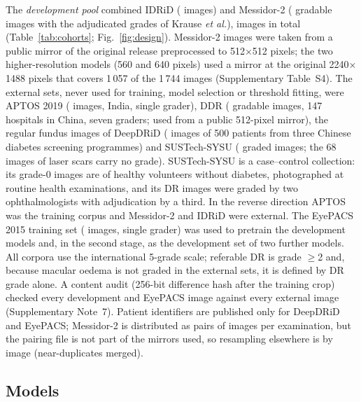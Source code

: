 The \emph{development pool} combined IDRiD\cite{porwal2018idrid,porwal2020challenge}
( images) and Messidor-2\cite{decenciere2014messidor,abramoff2013messidor2}
( gradable images with the adjudicated grades of Krause \emph{et
al.}\cite{krause2018grader}),  images in total (Table~\ref{tab:cohorts};
Fig.~\ref{fig:design}). Messidor-2 images were taken from a public mirror of the original release
preprocessed to 512$\times$512 pixels; the two higher-resolution models (560 and 640 pixels) used a
mirror at the original 2240$\times$1488 pixels that covers 1\,057 of the 1\,744 images
(Supplementary Table~S4). The external sets, never used for training, model selection or threshold
fitting, were APTOS 2019 ( images, India, single grader), DDR\cite{li2019ddr}
( gradable images, 147 hospitals in China, seven graders; used from a public 512-pixel
mirror), the regular fundus images of DeepDRiD\cite{liu2022deepdrid} ( images of
500 patients from three Chinese diabetes screening programmes) and SUSTech-SYSU\cite{lin2020sustech}
( graded images; the 68 images of laser scars carry no grade). SUSTech-SYSU is a
case--control collection: its grade-0 images are of healthy volunteers without diabetes, photographed
at routine health examinations, and its DR images were graded by two ophthalmologists with
adjudication by a third\cite{lin2020sustech}. In the reverse direction APTOS was the training corpus
and Messidor-2 and IDRiD were external. The EyePACS 2015 training set ( images,
single grader) was used to pretrain the development models and, in the second stage, as the
development set of two further models.
All corpora use the international 5-grade scale\cite{wilkinson2003scale}; referable DR is grade
$\geq$2 and, because macular oedema is not graded in the external sets, it is defined by DR
grade alone. A content audit (256-bit difference hash after the training crop) checked every
development and EyePACS image against every external image (Supplementary Note~7).
Patient identifiers are published only for DeepDRiD and EyePACS; Messidor-2 is distributed as
pairs of images per examination, but the pairing file is not part of the mirrors used, so
resampling elsewhere is by image (near-duplicates merged).

\subsection{Models}

